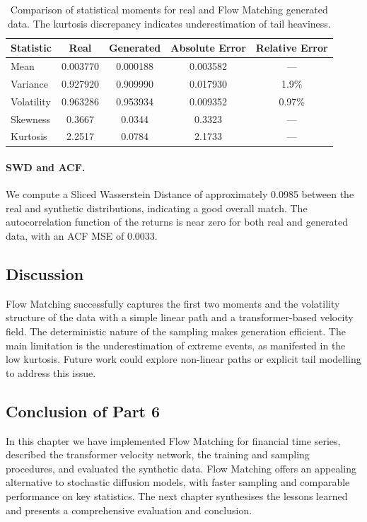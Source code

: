 \begin{table}[H]
  \centering
  \begin{tabular}{lcccc}
    \toprule
    Statistic & Real & Generated & Absolute Error & Relative Error \\
    \midrule
    Mean & 0.003770 & 0.000188 & 0.003582 & — \\
    Variance & 0.927920 & 0.909990 & 0.017930 & 1.9\% \\
    Volatility & 0.963286 & 0.953934 & 0.009352 & 0.97\% \\
    Skewness & 0.3667 & 0.0344 & 0.3323 & — \\
    Kurtosis & 2.2517 & 0.0784 & 2.1733 & — \\
    \bottomrule
  \end{tabular}
  \caption{Comparison of statistical moments for real and Flow
    Matching generated data.  The kurtosis discrepancy indicates
    underestimation of tail heaviness.}
  \label{tab:stats}
\end{table}

\paragraph{SWD and ACF.}  We compute a Sliced Wasserstein Distance of
approximately 0.0985 between the real and synthetic distributions,
indicating a good overall match.  The autocorrelation function of the
returns is near zero for both real and generated data, with an ACF
MSE of 0.0033.

\subsection{Discussion}

Flow Matching successfully captures the first two moments and the
volatility structure of the data with a simple linear path and a
transformer-based velocity field.  The deterministic nature of the
sampling makes generation efficient.  The main limitation is the
underestimation of extreme events, as manifested in the low kurtosis.
Future work could explore non-linear paths or explicit tail
modelling to address this issue.

\subsection{Conclusion of Part 6}

In this chapter we have implemented Flow Matching for financial time
series, described the transformer velocity network, the training and
sampling procedures, and evaluated the synthetic data.  Flow
Matching offers an appealing alternative to stochastic diffusion
models, with faster sampling and comparable performance on key
statistics.  The next chapter synthesises the lessons learned and
presents a comprehensive evaluation and conclusion.
